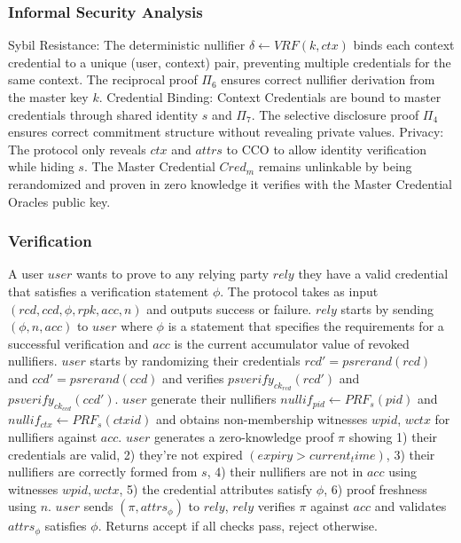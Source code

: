 \subsubsection{Informal Security Analysis}
Sybil Resistance: The deterministic nullifier $\delta \gets VRF(k,ctx)$ binds each context credential to a unique (user, context) pair, preventing multiple credentials for the same context. The reciprocal proof $\Pi_6$ ensures correct nullifier derivation from the master key $k$. 
Credential Binding: Context Credentials are bound to master credentials through shared identity $s$ and $\Pi_7$. The selective disclosure proof $\Pi_4$ ensures correct commitment structure without revealing private values. 
Privacy: The protocol only reveals $ctx$ and $attrs$ to CCO to allow identity verification while hiding $s$. The Master Credential $Cred_m$ remains unlinkable by being  rerandomized and proven in zero knowledge it verifies with the Master Credential Oracles public key.






\subsubsection{Verification}
A user $user$ wants to prove to any relying party $rely$ they have a valid credential that satisfies a verification statement $\phi$.
The protocol takes as input $(rcd, ccd, \phi, rpk, acc, n)$ and outputs success or failure.
$rely$ starts by sending $(\phi, n, acc)$ to $user$ where $\phi$ is a statement that specifies the requirements for a successful verification and $acc$ is the current accumulator value of revoked nullifiers.
$user$ starts by randomizing their credentials $rcd' = psrerand(rcd)$ and $ccd' = psrerand(ccd)$ and verifies $psverify_{ck_{rcd}}(rcd')$ and $psverify_{ck_{ccd}}(ccd')$. $user$ generate their nullifiers $nullif_{pid} \gets PRF_s(pid)$ and $nullif_{ctx} \gets PRF_s(ctxid)$ and obtains non-membership witnesses $wpid$, $wctx$ for nullifiers against $acc$.
$user$ generates a zero-knowledge proof $\pi$ showing 1) their credentials are valid, 2) they're not expired $(expiry > current_time)$, 3) their nullifiers are correctly formed from $s$, 4) their nullifiers are not in $acc$ using witnesses $wpid, wctx$, 5) the credential attributes satisfy $\phi$, 6) proof freshness using $n$.
$user$ sends $(\pi, attrs_{\phi})$ to $rely$, $rely$ verifies $\pi$ against $acc$ and validates $attrs_{\phi}$ satisfies $\phi$. Returns accept if all checks pass, reject otherwise.



